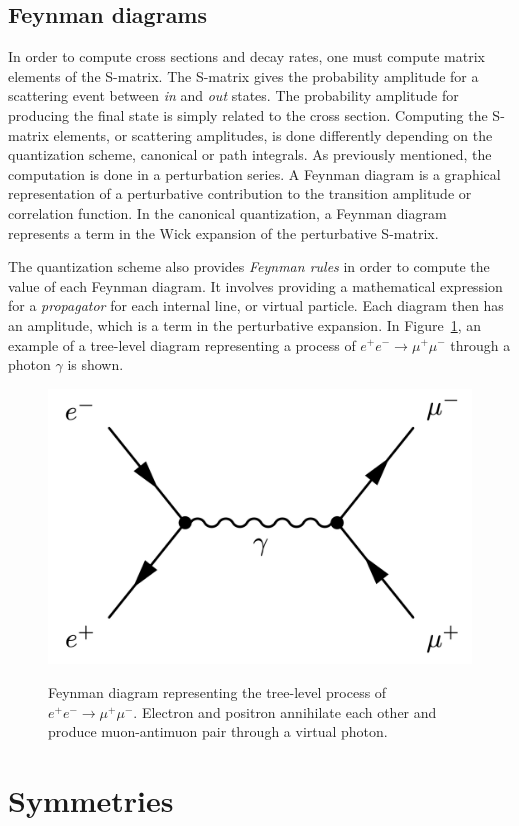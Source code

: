 \subsection{Feynman diagrams}

In order to compute cross sections and decay rates, one must compute matrix elements of the S-matrix. The S-matrix gives the probability amplitude for a scattering event between \emph{in} and \emph{out} states. The probability amplitude for producing the final state is simply related to the cross section. Computing the S-matrix elements, or scattering amplitudes, is done differently depending on the quantization scheme, canonical or path integrals. As previously mentioned, the computation is done in a perturbation series. A Feynman diagram is a graphical representation of a perturbative contribution to the transition amplitude or correlation function. In the canonical quantization, a Feynman diagram represents a term in the Wick expansion of the perturbative S-matrix. 

The quantization scheme also provides \emph{Feynman rules} in order to compute the value of each Feynman diagram. It involves providing a mathematical expression for a \emph{propagator} for each internal line, or virtual particle. Each diagram then has an amplitude, which is a term in the perturbative expansion. In Figure~\ref{fig:e-to-mu-feynman}, an example of a tree-level diagram representing a process of $e^+ e^- \rightarrow \mu^+ \mu^-$ through a photon $\gamma$ is shown.

\begin{figure}[!htb]
\centering
\includegraphics[width=0.5\linewidth]{plots/feynman_diagrams/feynman_e_to_mu.png}  \\
\caption[Electrons to Muons Feynman diagram]{Feynman diagram representing the tree-level process of $e^+ e^- \rightarrow \mu^+ \mu^-$. Electron and positron annihilate each other and produce muon-antimuon pair through a virtual photon.}
\label{fig:e-to-mu-feynman}
\end{figure}

\clearpage
\section{Symmetries}

